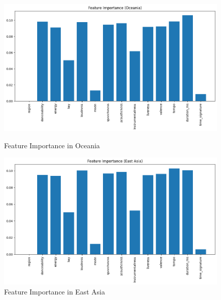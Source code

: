 \begin{figure}[h]
    \centering
    \begin{minipage}{0.45\textwidth}
        \centering
        \includegraphics[width=\linewidth]{media/rf_feature_imp_ocenia.png}
        \caption{Feature Importance in Oceania}
    \end{minipage}%
    \hspace{0.05\textwidth} %
    \begin{minipage}{0.45\textwidth}
        \centering
        \includegraphics[width=\linewidth]{media/rf_feature_imp_east_asia.png}
        \caption{Feature Importance in East Asia}
    \end{minipage}
\end{figure}

